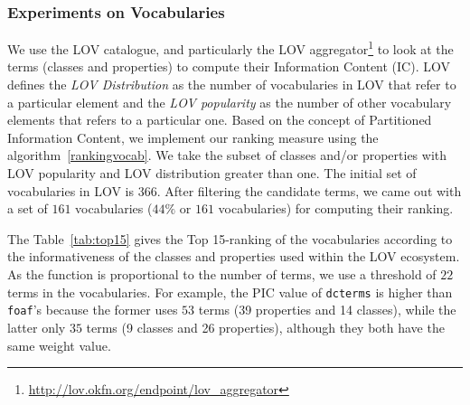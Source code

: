 \subsubsection{Experiments on Vocabularies}
\label{sec:experiments}
We use the LOV catalogue, and particularly the LOV aggregator\footnote{\url{http://lov.okfn.org/endpoint/lov_aggregator}} to look at the terms (classes and properties) to compute their Information Content (IC). LOV defines the \textit{LOV Distribution} as the number of vocabularies in LOV that refer to a particular element and the \textit{LOV popularity} as the number of other vocabulary elements that refers to a particular one. Based on the concept of Partitioned Information Content, we implement our ranking measure using the algorithm~\ref{rankingvocab}. We take the subset of classes and/or properties with LOV popularity and LOV distribution greater than one. The initial set of vocabularies in LOV is $366$. After filtering the candidate terms, we came out with a set of $161$ vocabularies ($44\%$ or $161$ vocabularies) for computing their ranking.

The Table~\ref{tab:top15} gives the Top 15-ranking of the vocabularies according to the informativeness of the classes and properties used within the LOV ecosystem. As the function is proportional to the number of terms, we use a threshold of $22$ terms in the vocabularies. For example, the PIC value of \texttt{dcterms} is higher than \texttt{foaf}'s because the former uses $53$ terms (39 properties and 14 classes), while the latter only $35$ terms (9 classes and 26 properties), although they both have the same weight value.

